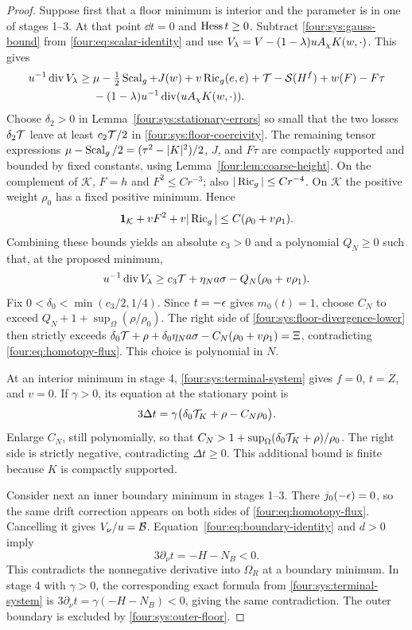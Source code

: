 \begin{proof}
Suppose first that a floor minimum is interior and the parameter is in
one of stages 1--3.  At that point $\dd t=0$ and $\operatorname{Hess} t\ge0$.
Subtract \eqref{four:sys:gauss-bound} from \eqref{four:eq:scalar-identity} and
use $V_\lambda=V-(1-\lambda)uA_\chi K(w,\cdot)$.  This gives
\begin{align*}
 u^{-1}\operatorname{div} V_\lambda\ge{}&
 \mu-\tfrac12\operatorname{Scal}_g+J(w)+v\operatorname{Ric}_g(e,e)
        +\mathcal T-\mathcal S(H^f)+w(F)-F\tau\\
 &-(1-\lambda)u^{-1}\operatorname{div}(uA_\chi K(w,\cdot)).
\end{align*}
Choose $\delta_2>0$ in Lemma~\ref{four:sys:stationary-errors} so small that
the two losses $\delta_2\mathcal T$ leave at least $c_2\mathcal T/2$ in
\eqref{four:sys:floor-coercivity}.  The remaining tensor expressions
$\mu-\operatorname{Scal}_g/2=(\tau^2-|K|^2)/2$, $J$, and $F\tau$ are compactly
supported and bounded by fixed constants, using
Lemma~\ref{four:lem:coarse-height}.  On the complement of $\mathcal K$,
$F=h$ and $F^2\le C r^{-3}$; also
$|\operatorname{Ric}_g|\le C r^{-4}$.  On $\mathcal K$ the positive weight
$\rho_0$ has a fixed positive minimum.  Hence
\[
 \mathbf1_{\mathcal K}+vF^2+v|\operatorname{Ric}_g|
                   \le C(\rho_0+v\rho_1).
\]
Combining these bounds yields an absolute $c_3>0$ and a polynomial
$Q_N\ge0$ such that, at the proposed minimum,
\begin{equation}\label{four:sys:floor-divergence-lower}
 u^{-1}\operatorname{div} V_\lambda
   \ge c_3\mathcal T+\eta_N a\sigma-Q_N(\rho_0+v\rho_1).
\end{equation}
Fix
$0<\delta_0<\min(c_3/2,1/4)$.
Since $t=-\epsilon$ gives $m_0(t)=1$, choose $C_N$ to exceed
$Q_N+1+\sup_\Omega(\rho/\rho_0)$.  The right side of
\eqref{four:sys:floor-divergence-lower} then strictly exceeds
$\delta_0\mathcal T+\rho+\delta_0\eta_N a\sigma-C_N(\rho_0+v\rho_1)
=\Xi$, contradicting \eqref{four:eq:homotopy-flux}.  This choice is
polynomial in $N$.

At an interior minimum in stage 4, \eqref{four:sys:terminal-system} gives
$f=0$, $t=Z$, and $v=0$.  If $\gamma>0$, its equation at the
stationary point is
\[
 3\Delta t=\gamma\bigl(\delta_0\mathcal T_K+\rho-C_N\rho_0\bigr).
\]
Enlarge $C_N$, still polynomially, so that
$C_N>1+\sup_\Omega(\delta_0\mathcal T_K+\rho)/\rho_0$.
The right side is strictly negative, contradicting $\Delta t\ge0$.
This additional bound is finite because $K$ is compactly supported.

Consider next an inner boundary minimum in stages 1--3.
There $j_0(-\epsilon)=0$, so the same drift correction appears on both
sides of \eqref{four:eq:homotopy-flux}.  Cancelling it gives $V_\nu/u=\mathcal B$.
Equation~\eqref{four:eq:boundary-identity} and $d>0$ imply
\[
 3\partial_\nu t=-H-N_B<0.
\]
This contradicts the nonnegative derivative into $\Omega_R$ at a
boundary minimum.  In stage 4 with $\gamma>0$, the corresponding exact
formula from \eqref{four:sys:terminal-system} is
$3\partial_\nu t=\gamma(-H-N_B)<0$, giving the same contradiction.
The outer boundary is excluded by \eqref{four:sys:outer-floor}.


\end{proof}
